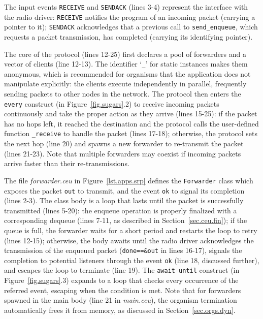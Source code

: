 \documentclass{sigplanconf}
\newcommand{\code}[1] {{\small{\texttt{#1}}}}
\newcommand{\1}{\;}
\newcommand{\2}{\;\;}
\newcommand{\3}{\;\;\;}
\newcommand{\5}{\;\;\;\;\;}
\begin{document}
The input events \code{RECEIVE} and \code{SENDACK} (lines 3-4) represent the 
interface with the radio driver:
\code{RECEIVE} notifies the program of an incoming packet (carrying a pointer 
to it);
\code{SENDACK} acknowledges that a previous call to \code{send\_enqueue}, which 
requests a packet transmission, has completed (carrying its identifying 
pointer).  

The core of the protocol (lines 12-25) first declares a pool of forwarders and 
a vector of clients (line 12-13).
%
The identifier `\code{\_}' for static instances makes them anonymous, which is 
recommended for organisms that the application does not manipulate explicitly:
the clients execute independently in parallel, frequently sending packets to 
other nodes in the network.
%
The protocol then enters the \code{every} construct (in 
Figure~\ref{fig.sugars}.2) to receive incoming packets continuously and take 
the proper action as they arrive (lines 15-25):
if the packet has no hops left, it reached the destination and the protocol 
calls the user-defined function \code{\_receive} to handle the packet (lines 
17-18);
otherwise, the protocol sets the next hop (line 20) and spawns a new forwarder 
to re-transmit the packet (lines 21-23).
%
Note that multiple forwarders may coexist if incoming packets arrive faster 
than their re-transmissions.

The file \emph{forwarder.ceu} in Figure~\ref{lst.apps.srp} defines the 
\code{Forwarder} class which exposes the packet \code{out} to transmit, and the 
event \code{ok} to signal its completion (lines 2-3).
%
The class body is a loop that lasts until the packet is successfully 
transmitted (lines 5-20):
the enqueue operation is properly finalized with a corresponding dequeue (lines 
7-11, as described in Section~\ref{sec.ceu.fin});
if the queue is full, the forwarder waits for a short period and restarts the 
loop to retry (lines 12-15);
otherwise, the body awaits until the radio driver acknowledges the transmission 
of the enqueued packet (\code{done==\&out} in lines 16-17), signals the 
completion to potential listeners through the event \code{ok} (line 18, 
discussed further), and escapes the loop to terminate (line 19).
The \code{await-until} construct (in Figure~\ref{fig.sugars}.3) expands to a 
loop that checks every occurrence of the referred event, escaping when the 
condition is met.
%
Note that for forwarders spawned in the main body (line 21 in \emph{main.ceu}), 
the organism termination automatically frees it from memory, as discussed in 
Section~\ref{sec.orgs.dyn}.
\end{document}
